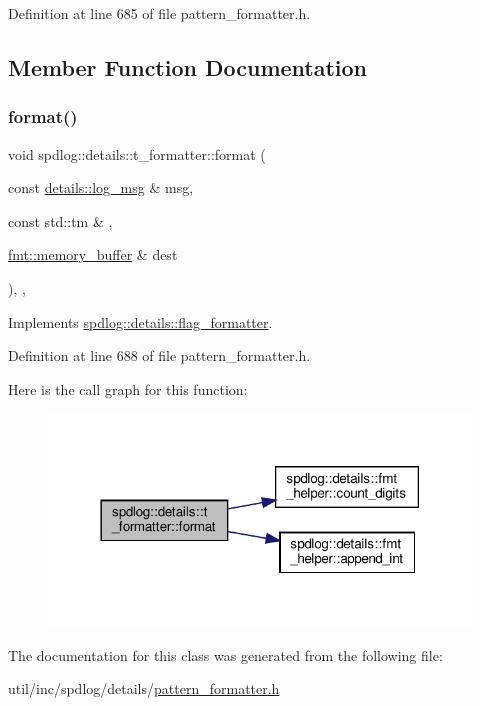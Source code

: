 Definition at line 685 of file pattern\+\_\+formatter.\+h.



\subsection{Member Function Documentation}
\mbox{\label{classspdlog_1_1details_1_1t__formatter_a58cd7de54067c8f05815a94edaf43e17}} 
\subsubsection{\texorpdfstring{format()}{format()}}
{\footnotesize\ttfamily void spdlog\+::details\+::t\+\_\+formatter\+::format (\begin{DoxyParamCaption}\item[{const \hyperlink{structspdlog_1_1details_1_1log__msg}{details\+::log\+\_\+msg} \&}]{msg,  }\item[{const std\+::tm \&}]{,  }\item[{\hyperlink{format_8h_a21cbf729f69302f578e6db21c5e9e0d2}{fmt\+::memory\+\_\+buffer} \&}]{dest }\end{DoxyParamCaption})\hspace{0.3cm}{\ttfamily [inline]}, {\ttfamily [override]}, {\ttfamily [virtual]}}



Implements \hyperlink{classspdlog_1_1details_1_1flag__formatter_a33fb3e42a4c8200cceb833d92b53fb67}{spdlog\+::details\+::flag\+\_\+formatter}.



Definition at line 688 of file pattern\+\_\+formatter.\+h.

Here is the call graph for this function\+:
\nopagebreak
\begin{figure}[H]
\begin{center}
\leavevmode
\includegraphics[width=318pt]{classspdlog_1_1details_1_1t__formatter_a58cd7de54067c8f05815a94edaf43e17_cgraph}
\end{center}
\end{figure}


The documentation for this class was generated from the following file\+:\begin{DoxyCompactItemize}
\item 
util/inc/spdlog/details/\hyperlink{pattern__formatter_8h}{pattern\+\_\+formatter.\+h}\end{DoxyCompactItemize}
